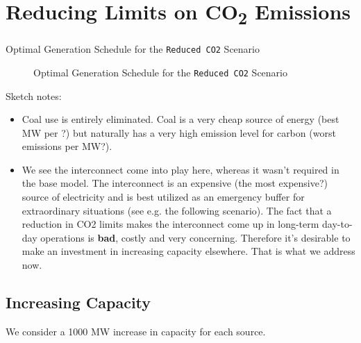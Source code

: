 \documentclass{article}
\begin{document}
    
    
    \section{Reducing Limits on CO\textsubscript{2} Emissions}
    
    \begin{table}[h!]\label{table:basic-optgensched}
    	\centering
    	\caption{Optimal Generation Schedule for the \texttt{Reduced CO2} Scenario}
    \end{table}
    
    \begin{figure}[H]
        \centering
    	\caption{Optimal Generation Schedule for the \texttt{Reduced CO2} Scenario}
    \end{figure}
    
    Sketch notes:
    
    \begin{itemize}
    	
        \item  Coal use is entirely eliminated.  Coal is a very cheap source of energy (best MW per \textsterling?) but naturally has a very high emission level for carbon (worst emissions per MW?).
        
        \item We see the interconnect come into play here, whereas it wasn't required in the base model.  The interconnect is an expensive (the most expensive?) source of electricity and is best utilized as an emergency buffer for extraordinary situations (see e.g. the following scenario).  The fact that a reduction in CO2 limits makes the interconnect come up in long-term day-to-day operations is \textbf{bad}, costly and very concerning.  Therefore it's desirable to make an investment in increasing capacity elsewhere.  That is what we address now.
    
    \end{itemize}
    
    
    \subsection{Increasing Capacity}
    
    We consider a 1000 MW increase in capacity for each source.
    
\end{document}
